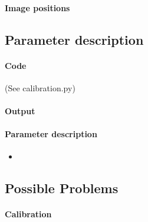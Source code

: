 \documentclass{scrartcl}
\begin{document}
\paragraph{Image positions}


\subsection{Parameter description}
\paragraph{Code}
(See calibration.py)


\paragraph{Output}

\paragraph{Parameter description}
\begin{itemize}
\item
\end{itemize}


\subsection{Possible Problems}
\paragraph{Calibration}
\end{document}
